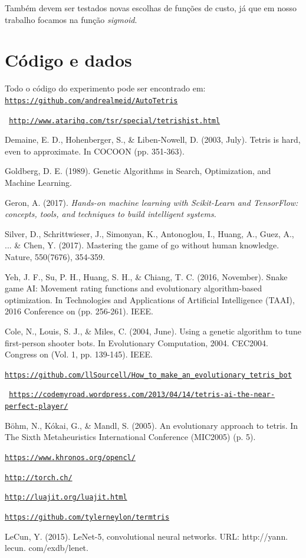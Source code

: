 \documentclass[conference]{IEEEtran}
\begin{document}
Também devem ser testados novas escolhas de funções de custo, já que em nosso trabalho focamos na função \textit{sigmoid}.

\section{Código e dados}
Todo o código do experimento pode ser encontrado em:\\
 \texttt{\url{https://github.com/andrealmeid/AutoTetris}}

\begin{thebibliography}{00}

 \texttt{ \url{http://www.atarihq.com/tsr/special/tetrishist.html}}

 Demaine, E. D., Hohenberger, S., \& Liben-Nowell, D. (2003, July). Tetris is hard, even to approximate. In COCOON (pp. 351-363).

 Goldberg, D. E. (1989). Genetic Algorithms in Search, Optimization, and Machine Learning.

  Geron, A. (2017). \textit{Hands-on machine learning with Scikit-Learn and TensorFlow: concepts, tools, and techniques to build intelligent systems.}

 Silver, D., Schrittwieser, J., Simonyan, K., Antonoglou, I., Huang, A., Guez, A., ... \& Chen, Y. (2017). Mastering the game of go without human knowledge. Nature, 550(7676), 354-359.

 Yeh, J. F., Su, P. H., Huang, S. H., \& Chiang, T. C. (2016, November). Snake game AI: Movement rating functions and evolutionary algorithm-based optimization. In Technologies and Applications of Artificial Intelligence (TAAI), 2016 Conference on (pp. 256-261). IEEE.

 Cole, N., Louis, S. J., \& Miles, C. (2004, June). Using a genetic algorithm to tune first-person shooter bots. In Evolutionary Computation, 2004. CEC2004. Congress on (Vol. 1, pp. 139-145). IEEE.

 \texttt{\url{https://github.com/llSourcell/How_to_make_an_evolutionary_tetris_bot}}

 \texttt{ \url{https://codemyroad.wordpress.com/2013/04/14/tetris-ai-the-near-perfect-player/}}

 Böhm, N., Kókai, G., \& Mandl, S. (2005). An evolutionary approach to tetris. In The Sixth Metaheuristics International Conference (MIC2005) (p. 5).

 \texttt{\url{https://www.khronos.org/opencl/}}

 \texttt{\url{http://torch.ch/}}

 \texttt{\url{http://luajit.org/luajit.html}}

 \texttt{\url{https://github.com/tylerneylon/termtris}}

 LeCun, Y. (2015). LeNet-5, convolutional neural networks. URL: http://yann. lecun. com/exdb/lenet.

\end{thebibliography}
\end{document}
